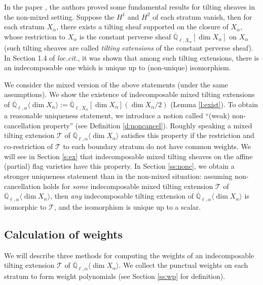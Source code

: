 \documentclass{amsart}
\theoremstyle{plain}
\theoremstyle{definition}
\theoremstyle{remark}
\numberwithin{equation}{subsection}
\begin{document}
In the paper \cite{BBM}, the authors proved some fundamental results for tilting sheaves in the non-mixed setting. Suppose the $H^1$ and $H^2$ of each stratum vanish, then for each stratum $X_\alpha$, there exists a tilting sheaf supported on the closure of $X_\alpha$, whose restriction to $X_\alpha$ is the constant perverse sheaf $\overline{\mathbb{Q}}_{\ell,X_\alpha}[\dim X_\alpha]$ on $X_\alpha$ (such tilting sheaves are called {\em tilting extensions} of the constant perverse sheaf). In Section 1.4 of {\em loc.cit.}, it was shown that among such tilting extensions, there is an indecomposable one which is unique up to (non-unique) isomorphism.

We consider the mixed version of the above statements (under the same assumptions). We show the existence of indecomposable mixed tilting extensions of ${\overline{\mathbb{Q}}_{\ell,\alpha}{\langle{{\dim X_\alpha}}\rangle}}:=\overline{\mathbb{Q}}_{\ell,X_\alpha}[\dim X_\alpha](\dim X_\alpha/2)$ (Lemma \ref{l:exist}). To obtain a reasonable uniqueness statement, we introduce a notion called ``(weak) non-cancellation property'' (see Definition \ref{d:noncancel}). Roughly speaking a mixed tilting extension ${\mathcal{T}}$ of ${\overline{\mathbb{Q}}_{\ell,\alpha}{\langle{{\dim X_\alpha}}\rangle}}$ satisfies this property if the restriction and co-restriction of ${\mathcal{T}}$ to each boundary stratum do not have common weights. We will see in Section \ref{s:ex} that indecomposable mixed tilting sheaves on the affine (partial) flag varieties have this property. In Section \ref{ss:nonc}, we obtain a stronger uniqueness statement than in the non-mixed situation: assuming non-cancellation holds for {\em some} indecomposable mixed tilting extension ${\mathcal{T}}$ of ${\overline{\mathbb{Q}}_{\ell,\alpha}{\langle{{\dim X_\alpha}}\rangle}}$, then {\em any} indecomposable tilting extension of ${\overline{\mathbb{Q}}_{\ell,\alpha}{\langle{{\dim X_\alpha}}\rangle}}$ is isomorphic to ${\mathcal{T}}$, and the isomorphism is unique up to a scalar. 

\subsection{Calculation of weights} We will describe three methods for computing the weights of an indecomposable tilting extension ${\mathcal{T}}$ of ${\overline{\mathbb{Q}}_{\ell,\alpha}{\langle{{\dim X_\alpha}}\rangle}}$. We collect the punctual weights on each stratum to form weight polynomials (see Section \ref{ss:wp} for definition).
\end{document}
